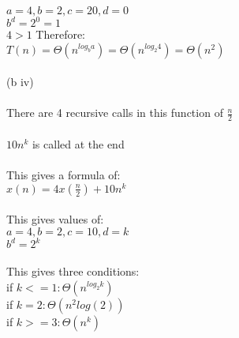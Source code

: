 \documentclass{article}
\begin{document}
\begin{solution}
\\ $a=4, b=2, c=20, d=0$
\\ $b^d = 2^0 = 1$
\\ $4>1$ Therefore:
\\ $T(n) = \Theta(n^{log_b a}) = \Theta(n^{log_2 4}) = \Theta(n^2)$
\newline
\\\\ (b iv)
\\\\ There are 4 recursive calls in this function of $\frac{n}{2}$
\\\\ $10n^k$ is called at the end
\\\\ This gives a formula of:
\\ $x(n) = 4x(\frac{n}{2})+10n^k$
\\\\ This gives values of:
\\ $a=4, b=2, c=10, d=k$
\\ $b^d = 2^k$
\\\\ This gives three conditions:
\\ if $ k <= 1: \Theta(n^{log_2 k})$
\\ if $k=2: \Theta(n^2log(2))$
\\ if $k >= 3: \Theta(n^k)$

\end{solution}
\end{document}
